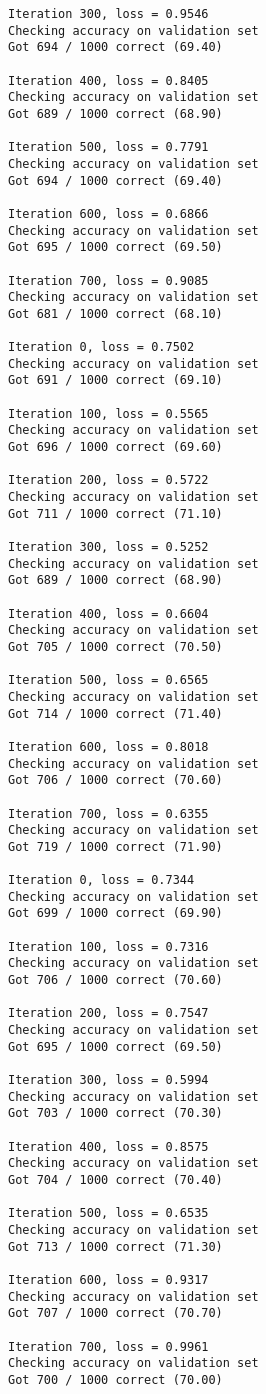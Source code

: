 \documentclass[11pt]{article}
\begin{document}
\begin{Verbatim}[commandchars=\\\{\}]
Iteration 300, loss = 0.9546
Checking accuracy on validation set
Got 694 / 1000 correct (69.40)

Iteration 400, loss = 0.8405
Checking accuracy on validation set
Got 689 / 1000 correct (68.90)

Iteration 500, loss = 0.7791
Checking accuracy on validation set
Got 694 / 1000 correct (69.40)

Iteration 600, loss = 0.6866
Checking accuracy on validation set
Got 695 / 1000 correct (69.50)

Iteration 700, loss = 0.9085
Checking accuracy on validation set
Got 681 / 1000 correct (68.10)

Iteration 0, loss = 0.7502
Checking accuracy on validation set
Got 691 / 1000 correct (69.10)

Iteration 100, loss = 0.5565
Checking accuracy on validation set
Got 696 / 1000 correct (69.60)

Iteration 200, loss = 0.5722
Checking accuracy on validation set
Got 711 / 1000 correct (71.10)

Iteration 300, loss = 0.5252
Checking accuracy on validation set
Got 689 / 1000 correct (68.90)

Iteration 400, loss = 0.6604
Checking accuracy on validation set
Got 705 / 1000 correct (70.50)

Iteration 500, loss = 0.6565
Checking accuracy on validation set
Got 714 / 1000 correct (71.40)

Iteration 600, loss = 0.8018
Checking accuracy on validation set
Got 706 / 1000 correct (70.60)

Iteration 700, loss = 0.6355
Checking accuracy on validation set
Got 719 / 1000 correct (71.90)

Iteration 0, loss = 0.7344
Checking accuracy on validation set
Got 699 / 1000 correct (69.90)

Iteration 100, loss = 0.7316
Checking accuracy on validation set
Got 706 / 1000 correct (70.60)

Iteration 200, loss = 0.7547
Checking accuracy on validation set
Got 695 / 1000 correct (69.50)

Iteration 300, loss = 0.5994
Checking accuracy on validation set
Got 703 / 1000 correct (70.30)

Iteration 400, loss = 0.8575
Checking accuracy on validation set
Got 704 / 1000 correct (70.40)

Iteration 500, loss = 0.6535
Checking accuracy on validation set
Got 713 / 1000 correct (71.30)

Iteration 600, loss = 0.9317
Checking accuracy on validation set
Got 707 / 1000 correct (70.70)

Iteration 700, loss = 0.9961
Checking accuracy on validation set
Got 700 / 1000 correct (70.00)

    \end{Verbatim}
\end{document}
